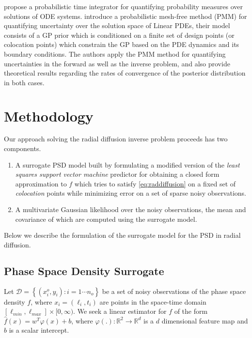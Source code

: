 \citet{conrad2017statistical} propose a probabilistic time integrator for quantifying probability 
measures over solutions of ODE systems. \citet{girolamiSullivanPDE} introduce a probabilistic 
mesh-free method (PMM) for quantifying uncertainty over the solution space of Linear PDEs, their 
model consists of a GP prior which is conditioned on a finite set of design points 
(or colocation points) which constrain the GP based on the PDE dynamics and its boundary 
conditions. The authors apply the PMM method for quantifying uncertainties in the forward as well 
as the inverse problem, and also provide theoretical results regarding the rates of convergence 
of the posterior distribution in both cases.

\section{Methodology}

Our approach solving the radial diffusion inverse problem proceeds has two components.
%
\begin{enumerate}
  \item A surrogate PSD model built by formulating a modified version of the 
        \emph{least squares support vector machine} predictor for obtaining a closed form 
        approximation to $f$ which tries to satisfy \cref{eq:raddiffusion} on a fixed set of 
        \emph{colocation} points while minimizing error on a set of sparse noisy observations.
  \item A multivariate Gaussian likelihood over the noisy observations, the mean and covariance of 
        which are computed using the surrogate model.
\end{enumerate}
%
Below we describe the formulation of the surrogate model for the PSD in radial diffusion.

\subsection{Phase Space Density Surrogate}

Let $\mathcal{D}= \left\{(x^{o}_{i}, y_{i}): i = 1 \cdots n_{o} \right\}$ be a set of noisy 
observations of the phase space density $f$, where $x_{i} = (\ell_{i}, t_{i})$ are points in the 
space-time domain $[\ell_{min}, \ell_{max}] \times [0, \infty)$. We seek a linear estimator for $f$ 
of the form $\hat{f}(x) = w^{T}\varphi(x) + b$, where 
$\varphi(.): \mathbb{R}^{2} \rightarrow \mathbb{R}^{d}$ is a $d$ dimensional feature map and $b$ 
is a scalar intercept.

